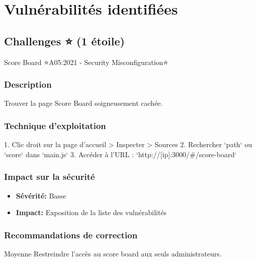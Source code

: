 
\chapter{Vulnérabilités identifiées}

\section{Challenges ⭐ (1 étoile)}

\begin{vulnerability}{Score Board ⭐}{A05:2021 - Security Misconfiguration}{⭐}
    \subsection*{Description}
    Trouver la page Score Board soigneusement cachée.
    
    \subsection*{Technique d'exploitation}
    1. Clic droit sur la page d'accueil > Inspecter > Sources
    2. Rechercher `path` ou `score` dans `main.js`
    3. Accéder à l'URL : `http://[ip]:3000/#/score-board`
    
    \subsection*{Impact sur la sécurité}
    \begin{itemize}
        \item \textbf{Sévérité:} Basse
        \item \textbf{Impact:} Exposition de la liste des vulnérabilités
    \end{itemize}
    
    \subsection*{Recommandations de correction}
    \begin{recommendation}{Moyenne}
        Restreindre l'accès au score board aux seuls administrateurs.
    \end{recommendation}
\end{vulnerability}

